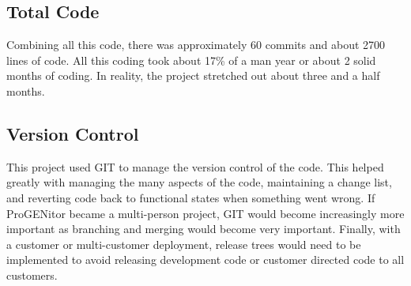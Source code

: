 \subsection{Total Code}
Combining all this code, there was approximately 60 commits and about 2700 lines
of code.  All this coding took about 17\% of a man year or about 2 solid months
of coding.  In reality, the project stretched out about three and a half months.
\subsection{Version Control}
This project used GIT to manage the version control of the code.  This helped
greatly with managing the many aspects of the code, maintaining a change list,
and reverting code back to functional states when something went wrong.  If
ProGENitor became a multi-person project, GIT would become increasingly more
important as branching and merging would become very important.  Finally,
with a customer or multi-customer deployment, release trees would need to be
implemented to avoid releasing development code or customer directed code to all
customers.
